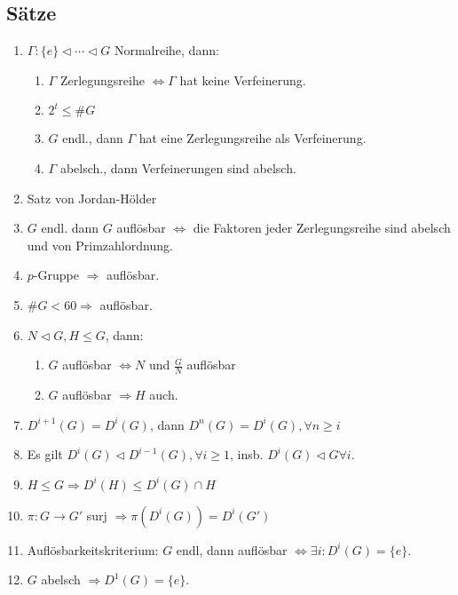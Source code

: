 \documentclass[twocolumn]{report}
\begin{document}
\subsection*{Sätze}
\begin{enumerate}[label=2.\arabic*, itemsep=0pt, topsep=0pt, parsep=0pt, partopsep=0pt, leftmargin=*]
    \item $\Gamma: \{e\} \triangleleft \cdots \triangleleft G$  Normalreihe, dann:
    \begin{enumerate}[label=(\arabic*), itemsep=0pt, topsep=0pt, parsep=0pt, partopsep=0pt, leftmargin=*]
        \item $\Gamma$ Zerlegungsreihe $\iff \Gamma$ hat keine Verfeinerung.
        \item $2^t \le \#G$
        \item $G$ endl., dann $\Gamma$ hat eine Zerlegungsreihe als Verfeinerung.
        \item $\Gamma$ abelsch., dann Verfeinerungen sind abelsch.
    \end{enumerate}
    \item Satz von Jordan-Hölder
    \item $G$ endl. dann $G$ auflösbar $\iff$ die Faktoren jeder Zerlegungsreihe sind abelsch und von Primzahlordnung.
    \item $p$-Gruppe $\Rightarrow$ auflösbar.
    \item $\#G < 60 \Rightarrow$ auflösbar.
    \item $N \triangleleft G, H \le G$, dann:
    \begin{enumerate}[label=(\arabic*), itemsep=0pt, topsep=0pt, parsep=0pt, partopsep=0pt, leftmargin=*]
        \item $G$ auflösbar $\iff N$ und $\frac{G}{N}$ auflösbar
        \item $G$ auflösbar $\Rightarrow H$ auch.
    \end{enumerate}
    \item $D^{i+1}(G) = D^i(G)$, dann $D^n(G) = D^i(G), \forall n \ge i$
    \item Es gilt $D^i(G) \triangleleft D^{i-1}(G), \forall i \ge 1$, insb. $D^i(G) \triangleleft G \forall i$.
    \item $H \le G \Rightarrow D^i(H) \le D^i(G) \cap H$
    \item $\pi: G \to G'$ surj $\Rightarrow \pi(D^i(G)) = D^i(G')$
    \item Auflösbarkeitskriterium: $G$ endl, dann auflösbar $\iff \exists i : D^i(G) = \{e\}$.
    \item $G$ abelsch $\Rightarrow D^1(G) = \{e\}$.
\end{enumerate}
\end{document}
